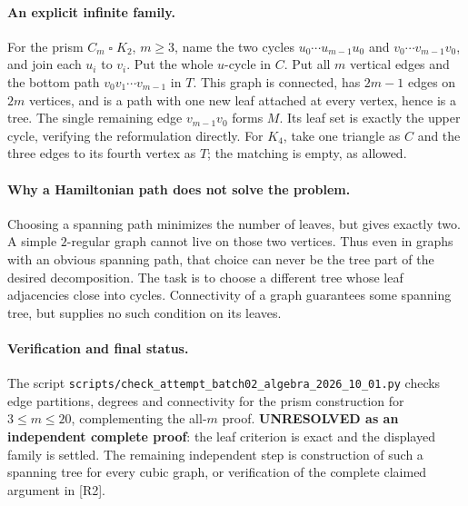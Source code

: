 \documentclass[11pt,a4paper]{article}
\begin{document}
\paragraph{An explicit infinite family.}
For the prism $C_m\mathbin{\square}K_2$, $m\ge3$, name the two
cycles $u_0\cdots u_{m-1}u_0$ and $v_0\cdots v_{m-1}v_0$, and
join each $u_i$ to $v_i$. Put the whole $u$-cycle in $C$.
Put all $m$ vertical edges and the bottom path
$v_0v_1\cdots v_{m-1}$ in $T$. This graph is connected, has
$2m-1$ edges on $2m$ vertices, and is a path with one new leaf
attached at every vertex, hence is a tree. The single remaining
edge $v_{m-1}v_0$ forms $M$. Its leaf set is exactly the upper
cycle, verifying the reformulation directly. For $K_4$, take one
triangle as $C$ and the three edges to its fourth vertex as $T$;
the matching is empty, as allowed.

\paragraph{Why a Hamiltonian path does not solve the problem.}
Choosing a spanning path minimizes the number of leaves, but gives
exactly two. A simple $2$-regular graph cannot live on those two
vertices. Thus even in graphs with an obvious spanning path, that
choice can never be the tree part of the desired decomposition.
The task is to choose a different tree whose leaf adjacencies close
into cycles. Connectivity of a graph guarantees some spanning tree,
but supplies no such condition on its leaves.

\paragraph{Verification and final status.}
The script
\texttt{scripts/check\_attempt\_batch02\_algebra\_2026\_10\_01.py}
checks edge partitions, degrees and connectivity for the prism
construction for $3\le m\le20$, complementing the all-$m$ proof.
\textbf{UNRESOLVED as an independent complete proof}: the leaf
criterion is exact and the displayed family is settled. The
remaining independent step is construction of such a spanning tree
for every cubic graph, or verification of the complete claimed
argument in [R2].
\end{document}
